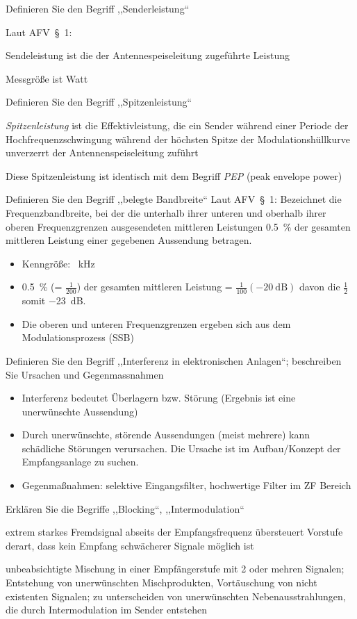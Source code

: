 \documentclass[avery5371,grid,frame,a4paper]{flashcards}
\newcommand{\card}[3]{
  \begin{flashcard}[{\chap} -- #1]{#2}#3\end{flashcard}
}
\begin{document}
\card{98}{Definieren Sie den Begriff ,,Senderleistung``}{
  \item
  Laut AFV~§~1:

  \item
  Sendeleistung ist die der Antennespeiseleitung zugeführte Leistung

  \item
  Messgröße ist Watt
}
\card{99}{Definieren Sie den Begriff ,,Spitzenleistung``}{
  \item
  \emph{Spitzenleistung} ist die Effektivleistung, die ein Sender während einer Periode der Hochfrequenzschwingung während der höchsten Spitze der Modulationshüllkurve unverzerrt der Antennenspeiseleitung zuführt

  \item Diese Spitzenleistung ist identisch mit dem Begriff \emph{PEP} (peak envelope power)
}
\card{100}{Definieren Sie den Begriff ,,belegte Bandbreite``}{
  \small
  Laut AFV~§~1: Bezeichnet die Frequenzbandbreite, bei der die unterhalb ihrer unteren und oberhalb ihrer
oberen Frequenzgrenzen ausgesendeten mittleren Leistungen \SI{0,5}{\percent} der gesamten mittleren Leistung einer gegebenen Aussendung betragen.

  \begin{itemize}\itemsep0pt
    \item Kenngröße: \SI{}{\kilo\Hz}
    \item \SI{0.5}{\percent} (= $\frac1{200}$) der gesamten mittleren Leistung = $\frac{1}{100} (-\SI{20}{\dB})$ davon die $\frac12$ somit \SI{-23}{\dB}.
    \item Die oberen und unteren Frequenzgrenzen ergeben sich aus dem Modulationsprozess (SSB)
  \end{itemize}
}
\card{101}{Definieren Sie den Begriff ,,Interferenz in elektronischen Anlagen``; beschreiben Sie Ursachen und Gegenmassnahmen}{
  \begin{itemize}
    \item Interferenz bedeutet Überlagern bzw. Störung (Ergebnis ist eine unerwünschte Aussendung)
    \item Durch unerwünschte, störende Aussendungen (meist mehrere) kann schädliche Störungen verursachen.
      Die Ursache ist im Aufbau/Konzept der Empfangsanlage zu suchen.
    \item Gegenmaßnahmen: selektive Eingangsfilter, hochwertige Filter im ZF Bereich
  \end{itemize}
}
\card{102}{Erklären Sie die Begriffe ,,Blocking``, ,,Intermodulation``}{
  \begin{description}\itemsep-7pt
    \item[Blocking]
      extrem starkes Fremdsignal abseits der Empfangsfrequenz
      übersteuert Vorstufe derart, dass kein Empfang schwächerer Signale möglich ist
    \item[Intermodulation]
      unbeabsichtigte Mischung in einer Empfängerstufe mit 2 oder mehren Signalen;
      Entstehung von unerwünschten Mischprodukten, Vortäuschung von nicht existenten Signalen;
      zu unterscheiden von unerwünschten Nebenausstrahlungen, die durch Intermodulation im Sender entstehen
  \end{description}
}
\end{document}
